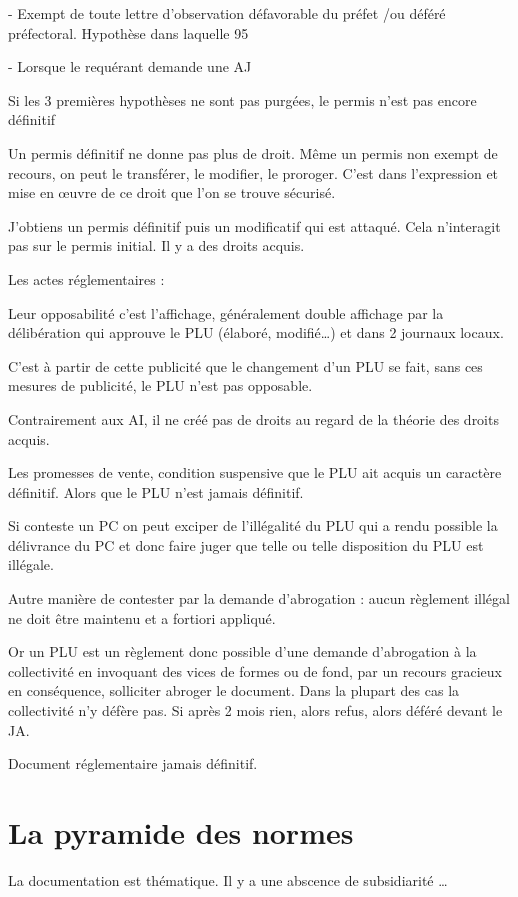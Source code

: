 		-	Exempt de toute lettre d’observation défavorable du préfet /ou déféré préfectoral. Hypothèse dans laquelle 95%

		-	Lorsque le requérant demande une AJ

		Si les 3 premières hypothèses ne sont pas purgées, le permis n’est pas encore définitif

		Un permis définitif ne donne pas plus de droit. Même un permis non exempt de recours, on peut le transférer, le modifier, le proroger. C’est dans l’expression et mise en œuvre de ce droit que l’on se trouve sécurisé.

		J’obtiens un permis définitif puis un modificatif qui est attaqué. Cela n’interagit pas sur le permis initial. Il y a des droits acquis.

		Les actes réglementaires :

		Leur opposabilité c’est l’affichage, généralement double affichage par la délibération qui approuve le PLU (élaboré, modifié…) et dans 2 journaux locaux.

		C’est à partir de cette publicité que le changement d’un PLU se fait, sans ces mesures de publicité, le PLU n’est pas opposable.

		Contrairement aux AI, il ne créé pas de droits au regard de la théorie des droits acquis.

		Les promesses de vente, condition suspensive que le PLU ait acquis un caractère définitif. Alors que le PLU n’est jamais définitif.

		Si conteste un PC on peut exciper de l’illégalité du PLU qui a rendu possible la délivrance du PC et donc faire juger que telle ou telle disposition du PLU est illégale.

		Autre manière de contester par la demande d’abrogation : aucun règlement illégal ne doit être maintenu et a fortiori appliqué.

		Or un PLU est un règlement donc possible d’une demande d’abrogation à la collectivité en invoquant des vices de formes ou de fond, par un recours gracieux en conséquence, solliciter abroger le document. Dans la plupart des cas la collectivité n’y défère pas. Si après 2 mois rien, alors refus, alors déféré devant le JA.

		Document réglementaire jamais définitif.



	\section{La pyramide des normes}

		La documentation est thématique. Il y a une abscence de subsidiarité \dots
